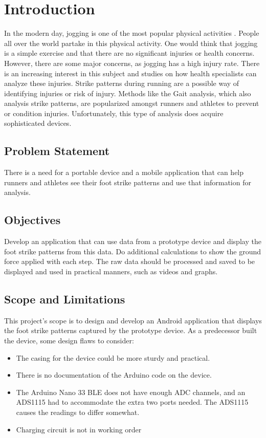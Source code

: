 \graphicspath{{introduction/fig/}}

\chapter{Introduction}
\label{chap:introduction}


In the modern day, jogging is one of the most popular physical activities \cite{statistaresearchdepartment2020}. People all over the world partake in this physical activity. One would think that jogging is a simple exercise and that there are no significant injuries or health concerns. However, there are some major concerns, as jogging has a high injury rate. There is an increasing interest in this subject and studies on how health specialists can analyze these injuries. Strike patterns during running are a possible way of identifying injuries or risk of injury. Methods like the Gait analysis, which also analysis strike patterns,  are popularized amongst runners and athletes to prevent or condition injuries. Unfortunately, this type of analysis does acquire sophisticated devices.

\section{Problem Statement}
There is a need for a portable device and a mobile application that can help runners and athletes see their foot strike patterns and use that information for analysis. 
\section{Objectives}
Develop an application that can use data from a prototype device and display the foot strike patterns from this data. Do additional calculations to show the ground force applied with each step. The raw data should be processed and saved to be displayed and used in practical manners, such as videos and graphs. 
\section{Scope and Limitations}
\label{limitations}
This project's scope is to design and develop an Android application that displays the foot strike patterns captured by the prototype device. As a predecessor built the device, some design flaws to consider:
\begin{itemize}
    \item The casing for the device could be more sturdy and practical.
    \item There is no documentation of the Arduino code on the device.
    \item The Arduino Nano 33 BLE does not have enough ADC channels, and an ADS1115 had to accommodate the extra two ports needed. The ADS1115 causes the readings to differ somewhat.
    \item Charging circuit is not in working order
  \end{itemize}

